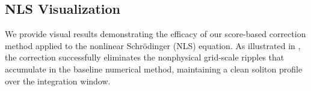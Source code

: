 \documentclass[letterpaper]{article} %
\begin{document}


\subsection{NLS Visualization}
We provide visual results demonstrating the efficacy of our score-based correction method applied to the nonlinear Schrödinger (NLS) equation. As illustrated in , the correction successfully eliminates the nonphysical grid-scale ripples that accumulate in the baseline numerical method, maintaining a clean soliton profile over the integration window.
\end{document}
